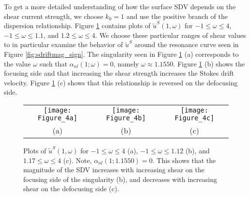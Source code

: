 \documentclass{JFM_Style/jfm}
\begin{document}
To get a more detailed understanding of how the surface SDV depends on the shear current strength, we choose $k_{0}=1$ and use the positive branch of the dispersion relationship.  Figure \ref{fig:stksdrfcomp} contains plots of $\tilde{u}^{S}(1,\omega)$ for $-1\leq \omega\leq 4$, $-1\leq \omega \leq 1.1$, and $1.2\le\omega\le4$.  We choose these particular ranges of shear values to in particular examine the behavior of $\tilde{u}^{S}$ around the resonance curve seen in Figure \ref{fig:sdriftmag_sign}.  The singularity seen in Figure \ref{fig:stksdrfcomp} (a) corresponds to the value $\omega$ such that $\alpha_{nl}(1;\omega)=0$, namely $\omega\approx1.1550$.  Figure \ref{fig:stksdrfcomp} (b) shows the focusing side and that increasing the shear strength increases the Stokes drift velocity.  Figure \ref{fig:stksdrfcomp} (c) shows that this relationship is reversed on the defocusing side.
\begin{figure}
\centering
\begin{tabular}{ccc}
\texttt{[image: Figure\_4a]} & \texttt{[image: Figure\_4b]} & \texttt{[image: Figure\_4c]}\\
(a) & (b) & (c)
\end{tabular}
\caption{\small Plots of $\tilde{u}^{S}(1,\omega)$ for $-1\leq \omega \leq 4$ (a), $-1\leq \omega \leq 1.12$ (b), and $1.17\leq \omega \leq 4$ (c).  Note, $\alpha_{nl}(1;1.1550)=0$.  This shows that the magnitude of the SDV increases with increasing shear on the focusing side of the singularity (b), and decreases with increasing shear on the defocusing side (c).}
\label{fig:stksdrfcomp}
\end{figure}
\end{document}
